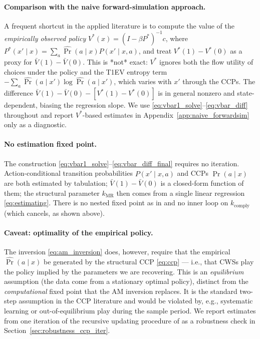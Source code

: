 \paragraph{Comparison with the naive forward-simulation approach.}
A frequent shortcut in the applied literature is to compute the value of the
\emph{empirically observed policy}
$V^*(x) = (I - \beta P^*)^{-1} c$, where $P^*(x' \mid x) = \sum_a
\hat\Pr(a \mid x) P(x' \mid x, a)$, and treat $V^*(1) - V^*(0)$ as a proxy for
$\bar V(1) - \bar V(0)$. This is *not* exact: $V^*$ ignores both the flow
utility of choices under the policy and the T1EV entropy term
$-\sum_a \hat\Pr(a \mid x') \log \hat\Pr(a \mid x')$, which
varies with $x'$ through the CCPs. The difference $\bar V(1) - \bar V(0) -
[V^*(1) - V^*(0)]$ is in general nonzero and state-dependent, biasing the
regression slope. We use \eqref{eq:vbar1_solve}--\eqref{eq:vbar_diff}
throughout and report $V^*$-based estimates in
Appendix~\ref{app:naive_forwardsim} only as a diagnostic.

\paragraph{No estimation fixed point.} The construction
\eqref{eq:vbar1_solve}--\eqref{eq:vbar_diff_final} requires no iteration.
Action-conditional transition probabilities $P(x' \mid x, a)$ and CCPs
$\hat\Pr(a \mid x)$ are both estimated by tabulation; $\bar V(1) - \bar V(0)$
is a closed-form function of them; the structural
parameter $k_{\text{MR}}$ then comes from a single linear regression
\eqref{eq:estimating}. There is no nested fixed point as in \citet{rust1987optimal}
and no inner loop on $k_{\text{comply}}$ (which cancels, as shown above).

\paragraph{Caveat: optimality of the empirical policy.} The inversion
\eqref{eq:am_inversion} does, however, require that the empirical
$\hat\Pr(a \mid x)$ be generated by the structural CCP \eqref{eq:ccp} — i.e.,
that CWSs play the policy implied by the parameters we are recovering. This
is an \emph{equilibrium} assumption (the data come from a stationary optimal
policy), distinct from the \emph{computational} fixed point that the AM
inversion replaces. It is the standard two-step assumption in the CCP
literature \citep{hotzmillersanders1994, aguirregabiriamira2002,
bajaribenkardlevin2007} and would be violated by, e.g., systematic learning or
out-of-equilibrium play during the sample period. We report estimates from one
iteration of the recursive updating procedure of \citet{aguirregabiriamira2002}
as a robustness check in Section~\ref{sec:robustness_ccp_iter}.

